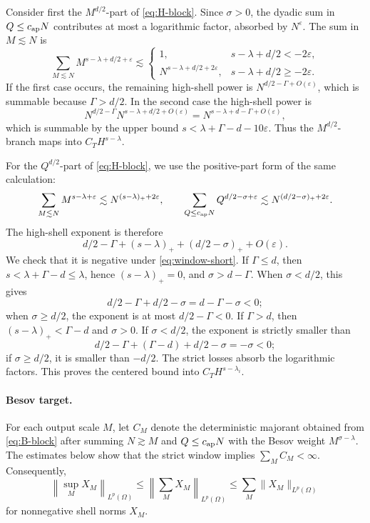 \documentclass[11pt,reqno]{amsart}
\numberwithin{equation}{section}
\theoremstyle{plain}
\theoremstyle{definition}
\newcommand{\eps}{\varepsilon}
\begin{document}
Consider first the \(M^{d/2}\)-part of \eqref{eq:H-block}.  Since \(\sigma>0\), the dyadic sum in \(Q\le c_{\rm ap}N\) contributes at most a logarithmic factor, absorbed by \(N^\eps\).  The sum in \(M\lesssim N\) is
\[
        \sum_{M\lesssim N}M^{s-\lambda+d/2+\eps}
        \lesssim
        \begin{cases}
        1, & s-\lambda+d/2<-2\eps,\\
        N^{s-\lambda+d/2+2\eps}, & s-\lambda+d/2\ge -2\eps.
        \end{cases}
\]
If the first case occurs, the remaining high-shell power is \(N^{d/2-\Gamma+O(\eps)}\), which is summable because \(\Gamma>d/2\).  In the second case the high-shell power is
\[
        N^{d/2-\Gamma}N^{s-\lambda+d/2+O(\eps)}
        =N^{s-\lambda+d-\Gamma+O(\eps)},
\]
which is summable by the upper bound \(s<\lambda+\Gamma-d-10\eps\).  Thus the \(M^{d/2}\)-branch maps into \(C_TH^{s-\lambda}\).

For the \(Q^{d/2}\)-part of \eqref{eq:H-block}, we use the positive-part form of the same calculation:
\begin{equation}\label{eq:H-Q-positive}
        \sum_{M\lesssim N}M^{s-\lambda+\eps}
        \lesssim N^{(s-\lambda)_++2\eps},
        \qquad
        \sum_{Q\le c_{\rm ap}N}Q^{d/2-\sigma+\eps}
        \lesssim N^{(d/2-\sigma)_++2\eps}.
\end{equation}
The high-shell exponent is therefore
\begin{equation}\label{eq:H-Q-exponent}
        d/2-\Gamma+(s-\lambda)_++(d/2-\sigma)_+ +O(\eps).
\end{equation}
We check that it is negative under \eqref{eq:window-short}.  If \(\Gamma\le d\), then \(s<\lambda+\Gamma-d\le\lambda\), hence \((s-\lambda)_+=0\), and \(\sigma>d-\Gamma\).  When \(\sigma<d/2\), this gives
\[
        d/2-\Gamma+d/2-\sigma=d-\Gamma-\sigma<0;
\]
when \(\sigma\ge d/2\), the exponent is at most \(d/2-\Gamma<0\).  If \(\Gamma>d\), then \((s-\lambda)_+<\Gamma-d\) and \(\sigma>0\).  If \(\sigma<d/2\), the exponent is strictly smaller than
\[
        d/2-\Gamma+(\Gamma-d)+d/2-\sigma=-\sigma<0;
\]
if \(\sigma\ge d/2\), it is smaller than \(-d/2\).  The strict losses absorb the logarithmic factors.  This proves the centered bound into \(C_TH^{s-\lambda_i}\).

\paragraph{Besov target.}
For each output scale \(M\), let \(C_M\) denote the deterministic majorant obtained from \eqref{eq:B-block} after summing \(N\gtrsim M\) and \(Q\le c_{\rm ap}N\) with the Besov weight \(M^{\sigma-\lambda}\).  The estimates below show that the strict window implies \(\sum_M C_M<\infty\).  Consequently,
\[
        \left\|\sup_M X_M\right\|_{L^p(\Omega)}
        \le \left\|\sum_M X_M\right\|_{L^p(\Omega)}
        \le \sum_M \|X_M\|_{L^p(\Omega)}
\]
for nonnegative shell norms \(X_M\).
\end{document}
